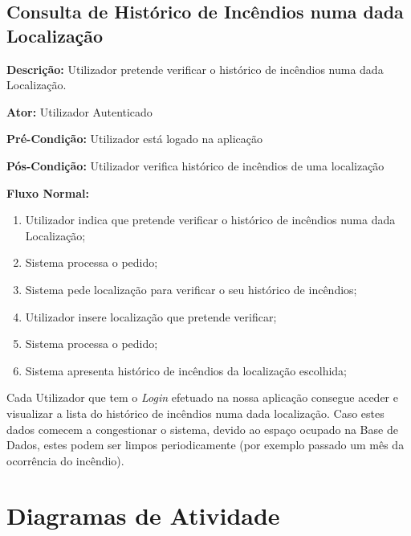 \documentclass[a4paper,12pt]{scrreprt}
\newcommand{\tab}{
    \hspace{1cm}}
\begin{document}
\clearpage

\section{Consulta de Histórico de Incêndios numa dada Localização}

\textbf{Descrição: }Utilizador pretende verificar o histórico de incêndios numa dada Localização.

\textbf{Ator: }Utilizador Autenticado

\textbf{Pré-Condição: }Utilizador está logado na aplicação

\textbf{Pós-Condição: }Utilizador verifica histórico de incêndios de uma localização

\textbf{Fluxo Normal: }
\begin{enumerate}
    \item Utilizador indica que pretende verificar o histórico de incêndios numa dada Localização;
    \item Sistema processa o pedido;
    \item Sistema pede localização para verificar o seu histórico de incêndios;
    \item Utilizador insere localização que pretende verificar;
    \item Sistema processa o pedido;
    \item Sistema apresenta histórico de incêndios da localização escolhida;
\end{enumerate}

\vspace{1.5cm}

\tab Cada Utilizador que tem o \textit{Login} efetuado na nossa aplicação consegue aceder e visualizar a lista do histórico de incêndios numa dada localização. Caso estes dados comecem a congestionar o sistema, devido ao espaço ocupado na Base de Dados, estes podem ser limpos periodicamente (por exemplo passado um mês da ocorrência do incêndio).







\chapter{Diagramas de Atividade}
\end{document}
